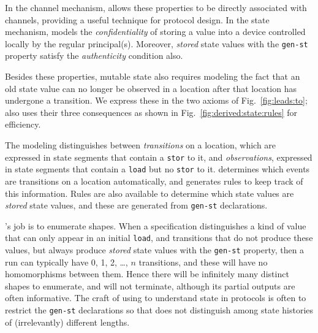 In the {channel} mechanism, {\cpsa} allows these properties to be
directly associated with channels, providing a useful technique for
protocol design.  In the state mechanism, {\cpsa} models the
\emph{confidentiality} of storing a value into a device controlled
locally by the regular principal(s).  Moreover, \emph{stored} state
values with the \texttt{gen-st} property satisfy the
\emph{authenticity} condition also.

Besides these properties, mutable state also requires modeling the
fact that an old state value can no longer be observed in a location
after that location has undergone a transition.  We express these in
the two axioms of Fig.~\ref{fig:leads:to}; {\cpsa} also uses their
three consequences as shown in Fig.~\ref{fig:derived:state:rules} for
efficiency.

The modeling distinguishes between \emph{transitions} on a location,
which are expressed in state segments that contain a \verb|stor| to
it, and \emph{observations}, expressed in state segments that contain
a \verb|load| but no \verb|stor| to it.  {\cpsa} determines which
events are transitions on a location automatically, and generates
rules to keep track of this information.  Rules are also available to
determine which state values are \emph{stored} state values, and these
are generated from \texttt{gen-st} declarations.

{\cpsa}'s job is to enumerate shapes.  When a specification
distinguishes a kind of value that can only appear in an initial
\verb|load|, and transitions that do not produce these values, but
always produce \emph{stored} state values with the \texttt{gen-st}
property, then a run can typically have 0, 1, 2, \dots, $n$
transitions, and these will have no homomorphisms between them.  Hence
there will be infinitely many distinct shapes to enumerate, and
{\cpsa} will not terminate, although its partial outputs are often
informative.  The craft of using {\cpsa} to understand state in
protocols is often to restrict the \texttt{gen-st} declarations so
that {\cpsa} does not distinguish among state histories of
(irrelevantly) different lengths.


